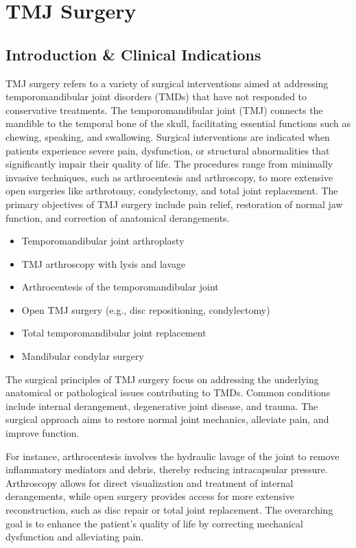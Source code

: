 \chapter{TMJ Surgery}

\section*{Introduction \& Clinical Indications}
TMJ surgery refers to a variety of surgical interventions aimed at addressing temporomandibular joint disorders (TMDs) that have not responded to conservative treatments. The temporomandibular joint (TMJ) connects the mandible to the temporal bone of the skull, facilitating essential functions such as chewing, speaking, and swallowing. Surgical interventions are indicated when patients experience severe pain, dysfunction, or structural abnormalities that significantly impair their quality of life. The procedures range from minimally invasive techniques, such as arthrocentesis and arthroscopy, to more extensive open surgeries like arthrotomy, condylectomy, and total joint replacement. The primary objectives of TMJ surgery include pain relief, restoration of normal jaw function, and correction of anatomical derangements.

\begin{itemize}
  \item Temporomandibular joint arthroplasty
  \item TMJ arthroscopy with lysis and lavage
  \item Arthrocentesis of the temporomandibular joint
  \item Open TMJ surgery (e.g., disc repositioning, condylectomy)
  \item Total temporomandibular joint replacement
  \item Mandibular condylar surgery
\end{itemize}

The surgical principles of TMJ surgery focus on addressing the underlying anatomical or pathological issues contributing to TMDs. Common conditions include internal derangement, degenerative joint disease, and trauma. The surgical approach aims to restore normal joint mechanics, alleviate pain, and improve function. 

For instance, arthrocentesis involves the hydraulic lavage of the joint to remove inflammatory mediators and debris, thereby reducing intracapsular pressure. Arthroscopy allows for direct visualization and treatment of internal derangements, while open surgery provides access for more extensive reconstruction, such as disc repair or total joint replacement. The overarching goal is to enhance the patient's quality of life by correcting mechanical dysfunction and alleviating pain.

